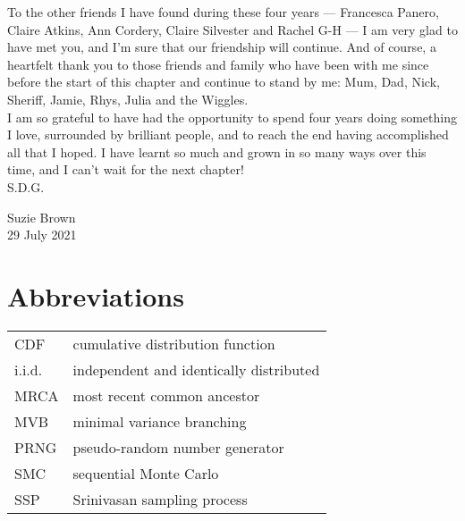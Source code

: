 \documentclass[oneside]{scrbook} %
\theoremstyle{definition}
\newcommand{\1}[1]{\mathbbm{1}_{#1}} %
\begin{document}
{To the other friends I have found during these four years --- Francesca Panero, Claire Atkins, Ann Cordery, Claire Silvester and Rachel G-H --- I am very glad to have met you, and I'm sure that our friendship will continue.
And of course, a heartfelt thank you to those friends and family who have been with me since before the start of this chapter and continue to stand by me: Mum, Dad, Nick, Sheriff, Jamie, Rhys, Julia and the Wiggles.
\\

I am so grateful to have had the opportunity to spend four years doing something I love, surrounded by brilliant people, and to reach the end having accomplished all that I hoped. I have learnt so much and grown in so many ways over this time, and I can't wait for the next chapter!
\\

S.D.G.
\\

\begin{flushright}
Suzie Brown\\
29 July 2021
\end{flushright}
}




\tableofcontents
\listoffigures
\listoftables
\listofalgorithms






\chapter{Abbreviations}
\begin{tabular}{p{} p{}}
CDF & cumulative distribution function \\
i.i.d. & independent and identically distributed \\
MRCA & most recent common ancestor \\
MVB & minimal variance branching \\
PRNG & pseudo-random number generator \\
SMC & sequential Monte Carlo \\
SSP & Srinivasan sampling process \\
\end{tabular}
\end{document}
